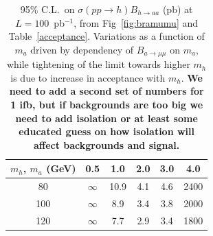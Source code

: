 \documentclass[aps,prl,twocolumn,nofootinbib,superscriptaddress]{revtex4}
\begin{document}
\begin{table}[htb]
\caption{95\% C.L.\ on $\sigma(pp \to h) B_{h \to aa}$ (pb) at $L = 100$~pb$^{-1}$, from Fig~\ref{fig:bramumu} and Table~\ref{acceptance}. Variations as a function of $m_a$ driven by dependency of $B_{a\to\mu\mu}$ on $m_a$, while tightening of the limit towards higher $m_h$ is due to increase in acceptance with $m_h$. {\bf We need to add a second set of numbers for 1 ifb, but if backgrounds are too big we need to add isolation or at least some educated guess on how isolation will affect backgrounds and signal.} \label{table_both_factorized}}
\begin{center}
\renewcommand{\arraystretch}{1.3}
\begin{tabular}{| c | c | c | c | c | c |}
\hline
\mbox{\hspace{0.25 cm}}$m_h$, $m_a$ (GeV)\mbox{\hspace{0.25 cm}} & \mbox{\hspace{0.25 cm}}0.5\mbox{\hspace{0.25 cm}} & \mbox{\hspace{0.25 cm}}1.0\mbox{\hspace{0.25 cm}} & \mbox{\hspace{0.25 cm}}2.0\mbox{\hspace{0.25 cm}} & \mbox{\hspace{0.25 cm}}3.0\mbox{\hspace{0.25 cm}} & \mbox{\hspace{0.25 cm}}4.0\mbox{\hspace{0.25 cm}} \\\hline
80 & $\infty$ & 10.9 & 4.1 & 4.6 & 2400 \\\hline
100 & $\infty$ & 8.9 & 3.4 & 3.8 & 2000 \\\hline
120 & $\infty$ & 7.7 & 2.9 & 3.4 & 1800 \\\hline
\end{tabular}
\end{center}
\end{table}

\end{document}
